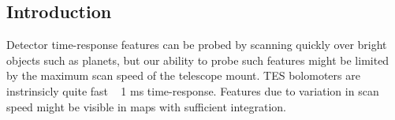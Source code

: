 \subsection{Introduction}

Detector time-response features can be probed by scanning quickly over bright objects such as planets, but our ability to probe such features might be limited by the maximum scan speed of the telescope mount. TES bolomoters are instrinsicly quite fast ~ 1 ms time-response. Features due to variation in scan speed might be visible in maps with sufficient integration.
